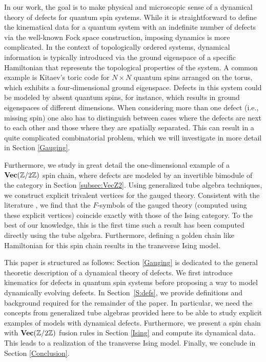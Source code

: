 In our work, the goal is to make physical and microscopic sense of a dynamical theory of defects for quantum spin systems. While it is straightforward to define the kinematical data for a quantum system with an indefinite number of defects via the well-known Fock space construction, imposing dynamics is more complicated. In the context of topologically ordered systems, dynamical information is typically introduced via the ground eigenspace of a specific Hamiltonian that represents the topological properties of the system. A common example is Kitaev's toric code for $N\times N$ quantum spins arranged on the torus, which exhibits a four-dimensional ground eigenspace. Defects in this system could be modeled by absent quantum spins, for instance, which results in ground eigenspaces of different dimensions. When considering more than one defect (i.e., missing spin) one also has to distinguish between cases where the defects are next to each other and those where they are spatially separated. This can result in a quite complicated combinatorial problem, which we will investigate in more detail in Section \ref{Gauging}.

Furthermore, we study in great detail the one-dimensional example of a $\textbf{Vec}(\mathbb{Z}/2\mathbb{Z})$ spin chain, where defects are modeled by an invertible bimodule of the category in Section \ref{subsec:VecZ2}.
Using generalized tube algebra techniques\cite{ocneanu}, we construct explicit trivalent vertices for the gauged theory. Consistent with the literature \cite{TY,ENO10,Bombin2010,BBCW14,WBV17}, we find that the $F$-symbols of the gauged theory (computed using these explicit vertices) coincide exactly with those of the Ising category. To the best of our knowledge, this is the first time such a result has been computed directly using the tube algebra. Furthermore, defining a golden chain like Hamiltonian \cite{Feiguin2007} for this spin chain results in the transverse Ising model.

This paper is structured as follows: Section \ref{Gauging} is dedicated to the general theoretic description of a dynamical theory of defects. We first introduce kinematics for defects in quantum spin systems before proposing a way to model dynamically evolving defects. In Section~\ref{S:defs}, we provide definitions and background required for the remainder of the paper. In particular, we need the concepts from generalized tube algebras provided here to be able to study explicit examples of models with dynamical defects. Furthermore, we present a spin chain with $\textbf{Vec}(\mathbb{Z}/2\mathbb{Z})$ fusion rules in Section \ref{Ising} and compute its dynamical data. This leads to a realization of the transverse Ising model. Finally, we conclude in Section \ref{Conclusion}.